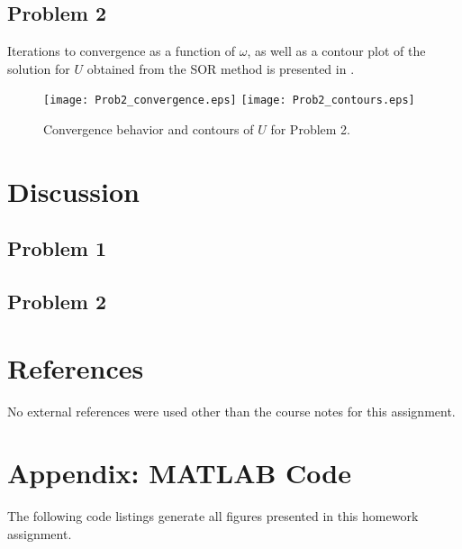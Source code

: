 \documentclass[11pt]{article}
\begin{document}
\subsection{Problem 2}

Iterations to convergence as a function of $\omega$, as well as a contour plot of the solution for $U$ obtained from the SOR method is presented in .

\begin{figure}[h!]
\begin{center}
\texttt{[image: Prob2\_convergence.eps]}
\texttt{[image: Prob2\_contours.eps]}
\\[0.5cm]
\caption{Convergence behavior and contours of $U$ for Problem 2.}
\label{fig:Prob2}
\end{center}
\end{figure}

\section{Discussion} %

\subsection{Problem 1}

\subsection{Problem 2}

\section{References} %

No external references were used other than the course notes for this assignment.

\section*{Appendix: MATLAB Code} %

The following code listings generate all figures presented in this homework assignment. 


\end{document}

